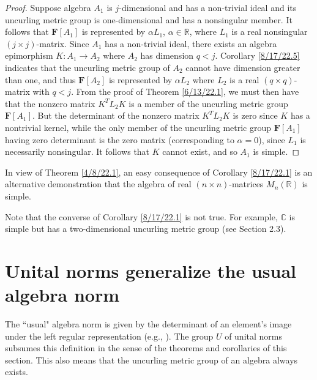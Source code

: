 \documentclass{amsart}
\numberwithin{equation}{section}
\theoremstyle{definition}
\numberwithin{theorem}{section}
\begin{document}
\begin{proof} Suppose algebra $A_1$ is $j$-dimensional and has a non-trivial ideal and its uncurling metric group  is  one-dimensional and has a nonsingular member.  It follows that $\mathbf{F}[A_1]$ is represented by  $\alpha L_1$, $\alpha\in \mathbb{R}$, where $L_1$ is a real nonsingular $(j\times j)$-matrix.  Since $A_1$ has a non-trivial ideal, there exists an algebra epimorphism $K:A_1\rightarrow A_2$ where $A_2$ has dimension $q<j$.  Corollary \ref{8/17/22.5} indicates that the uncurling metric group of $A_2$ cannot have dimension greater than one, and thus $\mathbf{F}[A_2]$ is represented by $\alpha L_2$ where $L_2$ is a real $(q\times q)$-matrix with $q<j$. From the proof of Theorem \ref{6/13/22.1}, we must then have that the nonzero matrix $ K^T L_2 K$ is a member of the uncurling metric group $\mathbf{F}[A_1]$.  But the determinant of the nonzero matrix $ K^T L_2 K$ is zero since $K$ has a nontrivial kernel, while the only member of the uncurling metric group $\mathbf{F}[A_1]$ having zero determinant is the zero matrix (corresponding to $\alpha=0$), since $L_1$ is necessarily nonsingular.   It follows that $K$ cannot exist, and so $A_1$ is simple. \end{proof}


In view of Theorem \ref{4/8/22.1}, an easy consequence of Corollary \ref{8/17/22.1} is an alternative demonstration that the algebra of real $(n\times n)$-matrices $ M_n(\mathbb{R})$ is simple.  

Note that the converse of Corollary \ref{8/17/22.1} is not true.  For example, $\mathbb{C}$ is simple but has a two-dimensional uncurling metric group (see Section 2.3).


\section{Unital norms generalize the usual algebra norm} 
The ``usual" algebra norm is given by the determinant of an element's image under the left regular representation (e.g., \cite{bourbaki:1989}).  The group $U$ of unital norms subsumes this definition in the sense of the theorems and corollaries of this section.  This also means that the uncurling metric group of an algebra always exists.
\end{document}
